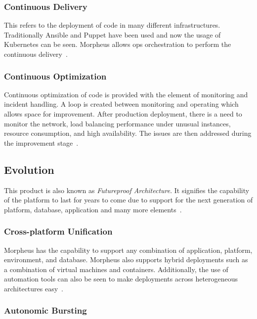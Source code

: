 \subsubsection{Continuous Delivery}

This refers to the deployment of code in many different infrastructures.
Traditionally Ansible and Puppet have been used and now the usage of Kubernetes
can be seen. Morpheus allows ops orchestration to perform the continuous
delivery~\cite{hid-sp18-416-www-morpheus-automation}.

\subsubsection{Continuous Optimization}

Continuous optimization of code is provided with the element of monitoring and
incident handling. A loop is created between monitoring and operating which
allows space for improvement. After production deployment, there is a need to
monitor the network, load balancing performance under unusual instances,
resource consumption, and high availability. The issues are then addressed
during the improvement stage~\cite{hid-sp18-416-www-morpheus-automation}.

\subsection{Evolution}

This product is also known as \textit{Futureproof Architecture}. It signifies
the capability of the platform to last for years to come due to support for the
next generation of platform, database, application and many more
elements~\cite{hid-sp18-416-www-morpheus-product-guide}.

\subsubsection{Cross-platform Unification}

Morpheus has the capability to support any combination of application,
platform, environment, and database. Morpheus also supports hybrid deployments
such as a combination of virtual machines and containers. Additionally, the use
of automation tools can also be seen to make deployments across heterogeneous
architectures easy~\cite{hid-sp18-416-www-morpheus-architecture}.

\subsubsection{Autonomic Bursting}

